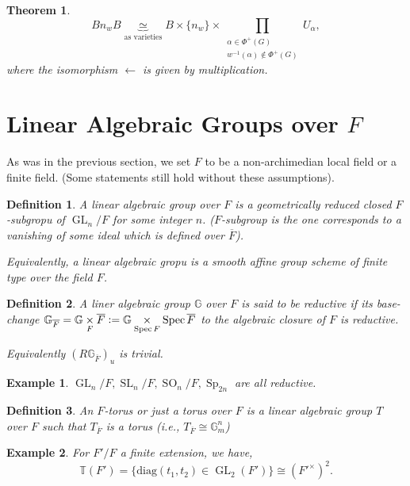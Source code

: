 \documentclass[10pt]{article}
\newtheorem{theorem}{Theorem} [section]
\newtheorem{definition}{Definition}[section]
\newtheorem{example}{Example}[section]
\numberwithin{equation}{theorem}
\DeclareMathOperator{\GL}{GL}
\DeclareMathOperator{\SL}{SL}
\DeclareMathOperator{\SO}{SO}
\DeclareMathOperator{\Sp}{Sp}
\DeclareMathOperator{\Spec}{Spec}
\newcommand{\defeq}{\vcentcolon=}
\newcommand{\G}[0]{\mathbb{G}}
\newcommand{\bT}[0]{\mathbb{T}}
\newcommand{\fib}[1]{%
  \mathbin{\mathop{\times}\limits_{#1}}%
}
\begin{document}
\begin{theorem}
    \begin{equation*}
        Bn_wB\underbrace{\simeq}_{\text{as varieties}}B\times\{n_w\}\times\prod_{\substack{\alpha\in\Phi^+(G)\\ w^{-1}(\alpha)\not\in\Phi^+(G)}}U_\alpha,
    \end{equation*}
    where the isomorphism $\leftarrow $ is given by multiplication.
\end{theorem}

\section{Linear Algebraic Groups over $F$}

As was in the previous section, we set $F$ to be a non-archimedian local field or a finite field. (Some statements still hold without these assumptions).

\begin{definition}
    A linear algebraic group over $F$ is a geometrically reduced closed $F$-subgropu of $\GL_n/F$ for some integer $n$. ($F$-subgroup is the one corresponds to a vanishing of some ideal which is defined over $\overline{F}$).
    \par Equivalently, a linear algebraic gropu is a smooth affine group scheme of finite type over the field $F$.
\end{definition}

\begin{definition}
    A liner algebraic group $\G$ over $F$ is said to be reductive if its base-change $\G_{\overline{F}} = \G\fib{F}\overline{F}\defeq \G\fib{\Spec F}\Spec \overline{F}$ to the algebraic closure of $F$ is reductive.
    \par Equivalently $(R\G_{\overline{F}})_u$ is trivial.
\end{definition}

\begin{example}
    $\GL_n/F,\SL_n/F,\SO_n/F,\Sp_{2n}$ are all reductive.
\end{example}

\begin{definition}
    An $F$-torus or just a torus over $F$ is a linear algebraic group $T$ over $F$ such that $T_{\overline{F}}$ is a torus (i.e., $T_{\overline{F}}\cong \G_m^n$)
\end{definition}

\begin{example}
    For $F'/F$ a finite extension, we have,
    \begin{equation*}
        \bT(F') = \{\mathrm{diag}(t_1,t_2)\in\GL_2(F')\}\cong ({F'}^\times)^2.
    \end{equation*}
\end{example}
\end{document}
